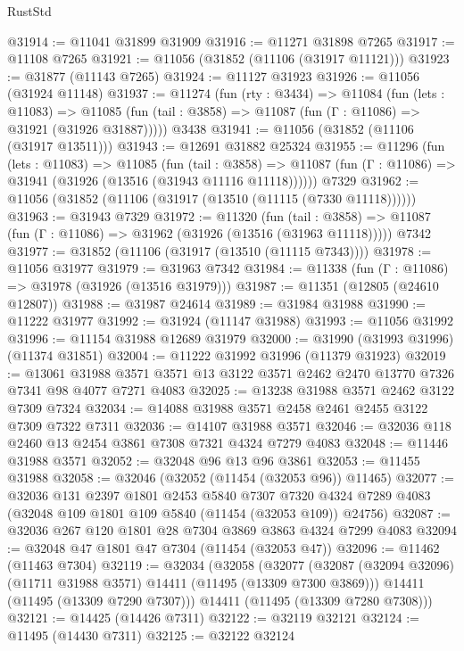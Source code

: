 \begin{lexlean}{RustStd}
\begin{coremodule}
@31914 := @11041 @31899 @31909
@31916 := @11271 @31898 @7265
@31917 := @11108 @7265
@31921 := @11056 (@31852 (@11106 (@31917 @11121)))
@31923 := @31877 (@11143 @7265)
@31924 := @11127 @31923
@31926 := @11056 (@31924 @11148)
@31937 := @11274
    (fun (rty : @3434) =>
    @11084
      (fun (lets : @11083) =>
      @11085 (fun (tail : @3858) => @11087 (fun (Γ : @11086) => @31921 (@31926 @31887)))))
    @3438
@31941 := @11056 (@31852 (@11106 (@31917 @13511)))
@31943 := @12691 @31882 @25324
@31955 := @11296
    (fun (lets : @11083) =>
    @11085
      (fun (tail : @3858) =>
      @11087 (fun (Γ : @11086) => @31941 (@31926 (@13516 (@31943 @11116 @11118))))))
    @7329
@31962 := @11056 (@31852 (@11106 (@31917 (@13510 (@11115 (@7330 @11118))))))
@31963 := @31943 @7329
@31972 := @11320
    (fun (tail : @3858) => @11087 (fun (Γ : @11086) => @31962 (@31926 (@13516 (@31963 @11118)))))
    @7342
@31977 := @31852 (@11106 (@31917 (@13510 (@11115 @7343))))
@31978 := @11056 @31977
@31979 := @31963 @7342
@31984 := @11338 (fun (Γ : @11086) => @31978 (@31926 (@13516 @31979)))
@31987 := @11351 (@12805 (@24610 @12807))
@31988 := @31987 @24614
@31989 := @31984 @31988
@31990 := @11222 @31977
@31992 := @31924 (@11147 @31988)
@31993 := @11056 @31992
@31996 := @11154 @31988 @12689 @31979
@32000 := @31990 (@31993 @31996) (@11374 @31851)
@32004 := @11222 @31992 @31996 (@11379 @31923)
@32019 := @13061
    @31988
    @3571
    @3571
    @13
    @3122
    @3571
    @2462
    @2470
    @13770
    @7326
    @7341
    @98
    @4077
    @7271
    @4083
@32025 := @13238 @31988 @3571 @2462 @3122 @7309 @7324
@32034 := @14088 @31988 @3571 @2458 @2461 @2455 @3122 @7309 @7322 @7311
@32036 := @14107 @31988 @3571
@32046 := @32036 @118 @2460 @13 @2454 @3861 @7308 @7321 @4324 @7279 @4083
@32048 := @11446 @31988 @3571
@32052 := @32048 @96 @13 @96 @3861
@32053 := @11455 @31988
@32058 := @32046 (@32052 (@11454 (@32053 @96)) @11465)
@32077 := @32036
    @131
    @2397
    @1801
    @2453
    @5840
    @7307
    @7320
    @4324
    @7289
    @4083
    (@32048 @109 @1801 @109 @5840 (@11454 (@32053 @109)) @24756)
@32087 := @32036 @267 @120 @1801 @28 @7304 @3869 @3863 @4324 @7299 @4083
@32094 := @32048 @47 @1801 @47 @7304 (@11454 (@32053 @47))
@32096 := @11462 (@11463 @7304)
@32119 := @32034
    (@32058
      (@32077
        (@32087 (@32094 @32096) (@11711 @31988 @3571) @14411 (@11495 (@13309 @7300 @3869)))
        @14411
        (@11495 (@13309 @7290 @7307)))
      @14411
      (@11495 (@13309 @7280 @7308)))
@32121 := @14425 (@14426 @7311)
@32122 := @32119 @32121
@32124 := @11495 (@14430 @7311)
@32125 := @32122 @32124

\end{coremodule}
\end{lexlean}
